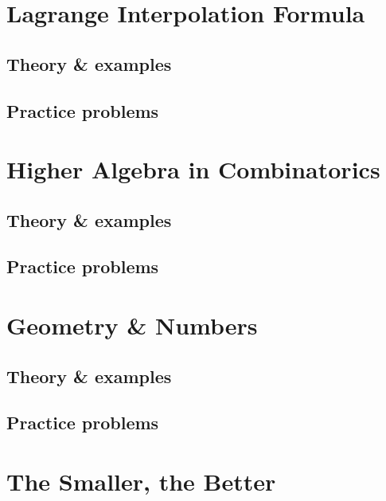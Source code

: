 \documentclass[oneside]{book}
\numberwithin{equation}{section}
\begin{document}

\section{Lagrange Interpolation Formula}

\subsection{Theory \& examples}

\subsection{Practice problems}


\section{Higher Algebra in Combinatorics}

\subsection{Theory \& examples}

\subsection{Practice problems}


\section{Geometry \& Numbers}

\subsection{Theory \& examples}

\subsection{Practice problems}


\section{The Smaller, the Better}
\end{document}

